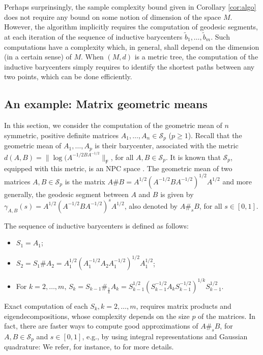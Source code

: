 \documentclass[10pt,a4paper]{article}
\theoremstyle{plain}
\theoremstyle{definition}
\theoremstyle{remark}
\begin{document}
Perhaps surprinsingly, the sample complexity bound given in Corollary \ref{cor:algo} does not require any bound on some notion of dimension of the space $M$. However, the algorithm implicitly requires the computation of geodesic segments, at each iteration of the sequence of inductive barycenters $\tilde b_1,\ldots,\tilde b_m$. Such computations have a complexity which, in general, shall depend on the dimension (in a certain sense) of $M$. When $(M,d)$ is a metric tree, the computation of the inductive barycenters simply requires to identify the shortest paths between any two points, which can be done efficiently.

\subsection{An example: Matrix geometric means} \label{sec:GM}

In this section, we consider the computation of the geometric mean of $n$ symmetric, positive definite matrices $A_1,\ldots,A_n\in \mathcal S_p$ ($p\geq 1$). Recall that the geometric mean of $A_1,\ldots,A_p$ is their barycenter, associated with the metric $d(A,B)=\|\log(A^{-1/2BA^{-1/2}}\|_{\textsf{F}}$, for all $A,B\in\mathcal S_p$. It is known that $\mathcal S_p$, equipped with this metric, is an NPC space \cite[Proposition 5]{bhatia2006riemannian}. The geometric mean of two matrices $A,B\in\mathcal S_p$ is the matrix $A\# B=A^{1/2}(A^{-1/2}BA^{-1/2})^{1/2}A^{1/2}$ and more generally, the geodesic segment between $A$ and $B$ is given by $\gamma_{A,B}(s)=A^{1/2}(A^{-1/2}BA^{-1/2})^sA^{1/2}$, also denoted by $A\#_s B$, for all $s\in [0,1]$.

The sequence of inductive barycenters is defined as follows:
\begin{itemize}
    \item $S_1=A_1$;
    \item $S_2=S_1\# A_2=A_1^{1/2}(A_1^{-1/2}A_2A_1^{-1/2})^{1/2}A_1^{1/2}$;
    \item For $k=2,\ldots,m$, $S_k = S_{k-1}\#_{\frac{1}{k}} A_k=S_{k-1}^{1/2}(S_{k-1}^{-1/2}A_kS_{k-1}^{-1/2})^{1/k}S_{k-1}^{1/2}$.
\end{itemize}
Exact computation of each $S_k, k=2,\ldots,m$, requires matrix products and eigendecompositions, whose complexity depends on the size $p$ of the matrices. In fact, there are faster ways to compute good approximations of $A\#_s B$, for $A,B\in\mathcal S_p$ and $s\in [0,1]$, e.g., by using integral representations and Gaussian quadrature: We refer, for instance, to \cite{bhatia2009positive,simon2019loewner} for more details. 
\end{document}
